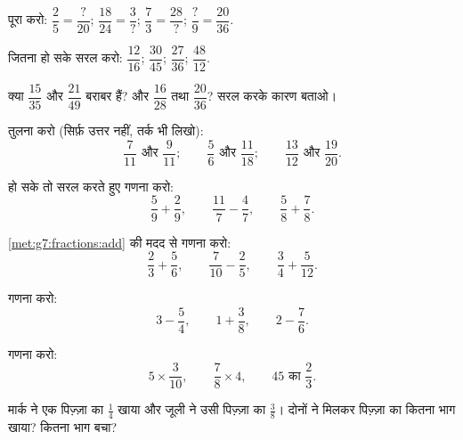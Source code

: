 \begin{exercise}[$\star$]\label{exo:g7:fractions:1}
पूरा करो: $\dfrac{2}{5} = \dfrac{?}{20}$; \quad
$\dfrac{18}{24} = \dfrac{3}{?}$; \quad
$\dfrac{7}{3} = \dfrac{28}{?}$; \quad
$\dfrac{?}{9} = \dfrac{20}{36}$.
\end{exercise}

\begin{exercise}[$\star$]\label{exo:g7:fractions:2}
जितना हो सके सरल करो:
$\dfrac{12}{16}$; \quad $\dfrac{30}{45}$; \quad $\dfrac{27}{36}$;
\quad $\dfrac{48}{12}$.
\end{exercise}

\begin{exercise}[$\star$]\label{exo:g7:fractions:3}
क्या $\dfrac{15}{35}$ और $\dfrac{21}{49}$ बराबर हैं? और
$\dfrac{16}{28}$ तथा $\dfrac{20}{36}$? सरल करके कारण बताओ।
\end{exercise}

\begin{exercise}[$\star$]\label{exo:g7:fractions:4}
तुलना करो (सिर्फ़ उत्तर नहीं, तर्क भी लिखो):
\[
\frac{7}{11} \text{ और } \frac{9}{11}; \qquad
\frac{5}{6} \text{ और } \frac{11}{18}; \qquad
\frac{13}{12} \text{ और } \frac{19}{20}.
\]
\end{exercise}

\begin{exercise}[$\star$]\label{exo:g7:fractions:5}
हो सके तो सरल करते हुए गणना करो:
\[
\frac{5}{9} + \frac{2}{9}, \qquad
\frac{11}{7} - \frac{4}{7}, \qquad
\frac{5}{8} + \frac{7}{8} .
\]
\end{exercise}

\begin{exercise}[$\star$]\label{exo:g7:fractions:6}
\cref{met:g7:fractions:add} की मदद से गणना करो:
\[
\frac{2}{3} + \frac{5}{6}, \qquad
\frac{7}{10} - \frac{2}{5}, \qquad
\frac{3}{4} + \frac{5}{12} .
\]
\end{exercise}

\begin{exercise}[$\star$]\label{exo:g7:fractions:7}
गणना करो:
\[
3 - \frac{5}{4}, \qquad
1 + \frac{3}{8}, \qquad
2 - \frac{7}{6} .
\]
\end{exercise}

\begin{exercise}[$\star$]\label{exo:g7:fractions:8}
गणना करो:
\[
5 \times \frac{3}{10}, \qquad
\frac{7}{8} \times 4, \qquad
45 \text{ का } \frac{2}{3} .
\]
\end{exercise}

\begin{exercise}[$\star\star$]\label{exo:g7:fractions:9}
मार्क ने एक पिज़्ज़ा का $\frac14$ खाया और जूली ने उसी पिज़्ज़ा का
$\frac38$। दोनों ने मिलकर पिज़्ज़ा का कितना भाग खाया? कितना भाग
बचा?
\end{exercise}

